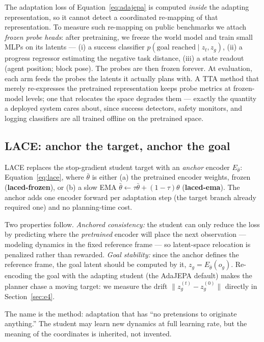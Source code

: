 \documentclass{article}
\newcommand{\lace}{\textsc{LACE}}
\newcommand{\Efroz}{E_{\bar\theta}}
\begin{document}
The adaptation loss of Equation~\eqref{eq:adajepa} is computed \emph{inside}
the adapting representation, so it cannot detect a coordinated re-mapping of
that representation. To measure such re-mapping on public benchmarks we
attach \emph{frozen probe heads}: after pretraining, we freeze the world model
and train small MLPs on its latents --- (i) a success classifier
$p(\text{goal reached} \mid z_t, z_g)$, (ii) a progress regressor estimating
the negative task distance, (iii) a state readout (agent position; block
pose). The probes are then frozen forever. At evaluation, each arm feeds the
probes the latents it actually plans with. A TTA method that merely
re-expresses the pretrained representation keeps probe metrics at
frozen-model levels; one that relocates the space degrades them --- exactly the
quantity a deployed system cares about, since success detectors, safety
monitors, and logging classifiers are all trained offline on the pretrained
space.

\subsection{\lace: anchor the target, anchor the goal}

\lace{} replaces the stop-gradient student target with an \emph{anchor}
encoder $\Efroz$:
Equation~\eqref{eq:lace}, where $\bar\theta$ is either (a) the pretrained
encoder weights, frozen (\textbf{laced-frozen}), or (b) a slow EMA
$\bar\theta \leftarrow \tau\bar\theta + (1{-}\tau)\theta$
(\textbf{laced-ema}). The anchor adds one encoder forward per adaptation step
(the target branch already required one) and no planning-time cost.

Two properties follow. \emph{Anchored consistency:} the student can only
reduce the loss by predicting where the \emph{pretrained} encoder will place
the next observation --- modeling dynamics in the fixed reference frame ---
so latent-space relocation is penalized rather than rewarded.
\emph{Goal stability:} since the anchor defines the reference frame, the goal
latent should be computed by it, $z_g = \Efroz(o_g)$. Re-encoding the goal
with the adapting student (the AdaJEPA default) makes the planner chase a
moving target: we measure the drift
$\lVert z_g^{(t)} - z_g^{(0)} \rVert$ directly in Section~\ref{sec:e4}.

The name is the method: adaptation that has ``no pretensions to originate
anything.'' The student may learn new dynamics at full learning rate, but the
meaning of the coordinates is inherited, not invented.
\end{document}

